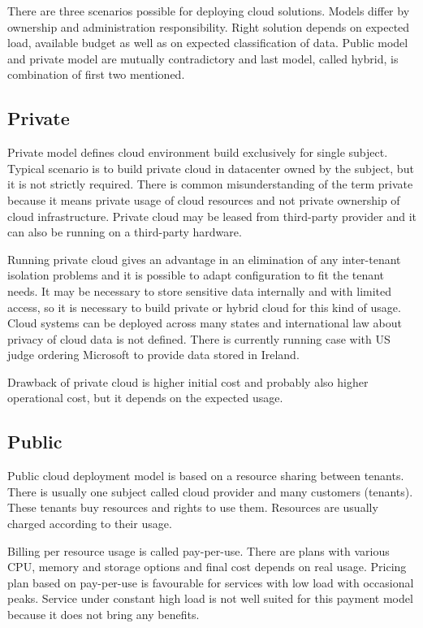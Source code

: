 
There are three scenarios possible for deploying cloud solutions. Models differ by ownership and administration responsibility. Right solution depends on expected load, available budget as well as on expected classification of data. Public model and private model are mutually contradictory and last model, called hybrid, is combination of first two mentioned.

\subsection{Private}
Private model defines cloud environment build exclusively for single subject. Typical scenario is to build private cloud in datacenter owned by the subject, but it is not strictly required. There is common misunderstanding of the term private because it means private usage of cloud resources and not private ownership of cloud infrastructure. Private cloud may be leased from third-party provider and it can also be running on a third-party hardware.

Running private cloud gives an advantage in an elimination of any inter-tenant isolation problems and it is possible to adapt configuration to fit the tenant needs.  It may be necessary to store sensitive data internally and with limited access, so it is necessary to build private or hybrid cloud for this kind of usage. 
Cloud systems can be deployed across many states and international law about privacy of cloud data is not defined.
There is currently running case with \Ac{US} judge ordering Microsoft to provide data stored in Ireland. \cite{wp-microsoft-ireland}

Drawback of private cloud is higher initial cost and probably also higher operational cost, but it depends on the expected usage.

\subsection{Public}
Public cloud deployment model is based on a resource sharing between tenants. There is usually one subject called cloud provider and many customers (tenants). These tenants buy resources and rights to use them. Resources are usually charged according to their usage.

Billing per resource usage is called pay-per-use. There are plans with various \Ac{CPU}, memory and storage options and final cost depends on real usage. Pricing plan based on pay-per-use is favourable for services with low load with occasional peaks. Service under constant high load is not well suited for this payment model because it does not bring any benefits.

